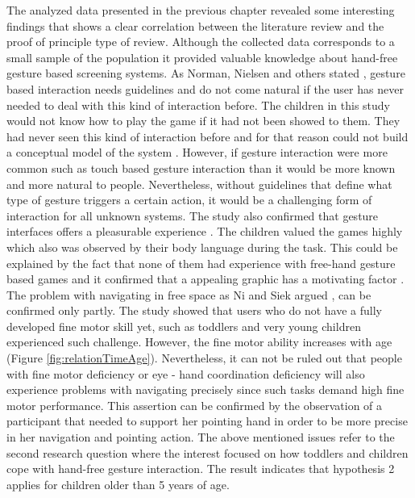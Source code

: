 The analyzed data presented in the previous chapter revealed some interesting findings that shows a clear correlation between the literature review and the proof of principle type of review. Although the collected data corresponds to a small sample of the population it provided valuable knowledge about hand-free gesture based screening systems. As Norman, Nielsen and others stated \cite{NormanNielsen2010, Norman2010}, gesture based interaction needs guidelines and do not come natural if the user has never needed to deal with this kind of interaction before. The children in this study would not know how to play the game if it had not been showed to them. They had never seen this kind of interaction before and for that reason could not build a conceptual model of the system \cite{Norman2002}. However, if gesture interaction were more common such as touch based gesture interaction than it would be more known and more natural to people. Nevertheless, without guidelines that define what type of gesture triggers a certain action, it would be a challenging form of interaction for all unknown systems. 
The study also confirmed that gesture interfaces offers a pleasurable experience \cite{Loehmann2013, RenGang2013}. The children valued the games highly which also was observed by their body language during the task. This could be explained by the fact that none of them had experience with free-hand gesture based games and it confirmed that a appealing graphic has a motivating factor \cite{Charsky2010, Paraskevopoulos2014}.
The problem with navigating in free space as Ni and Siek argued \cite{Siek2005, Ni2011}, can be confirmed only partly. The study showed that users who do not have a fully developed fine motor skill yet, such as toddlers and very young children experienced such challenge. However, the fine motor ability increases with age (Figure \ref{fig:relationTimeAge}). Nevertheless, it can not be ruled out that people with fine motor deficiency or eye - hand coordination deficiency will also experience problems with navigating precisely since such tasks demand high fine motor performance. This assertion can be confirmed by the observation of a participant that needed to support her pointing hand in order to be more precise in her navigation and pointing action. 
The above mentioned issues refer to the second research question where the interest focused on how toddlers and children cope with hand-free gesture interaction. The result indicates that hypothesis 2 applies for children older than 5 years of age.

